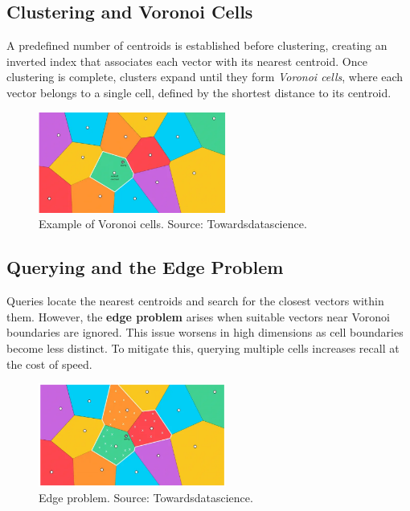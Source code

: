 \subsection{Clustering and Voronoi Cells}
A predefined number of centroids is established before clustering, creating an inverted index that associates each vector with its nearest centroid. Once clustering is complete, clusters expand until they form \textit{Voronoi cells}, where each vector belongs to a single cell, defined by the shortest distance to its centroid.
\begin{figure}[h]
    \centering
\includegraphics[width=0.55\textwidth]{IMAGES/immagine_2025-02-27_130909576.png}
    \caption[Voronoi Cells]{Example of Voronoi cells. Source: Towardsdatascience.\footnotemark[2]}
    \label{fig:Voronoi}
\end{figure}
\subsection{Querying and the Edge Problem}
Queries locate the nearest centroids and search for the closest vectors within them. However, the \textbf{edge problem} arises when suitable vectors near Voronoi boundaries are ignored. This issue worsens in high dimensions as cell boundaries become less distinct. To mitigate this, querying multiple cells increases recall at the cost of speed.
\begin{figure}[h]
    \centering
\includegraphics[width=0.55\textwidth]{IMAGES/immagine_2025-02-27_131611893.png}
    \caption[Edge problem]{Edge problem. Source: Towardsdatascience.\footnotemark[2]}
    \label{fig:VoronoiEdges}
\end{figure}
